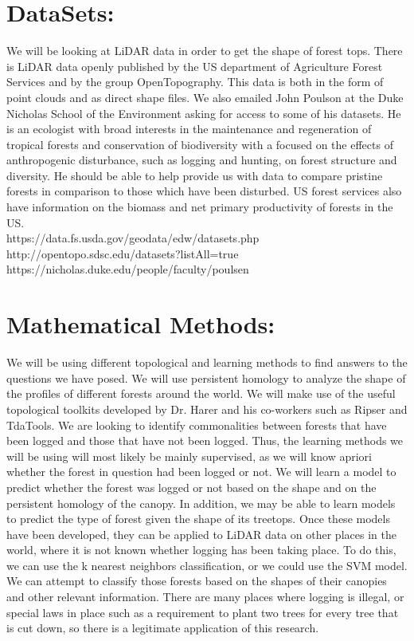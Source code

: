 \documentclass[11pt]{article}
\begin{document}
\section*{DataSets:}
We will be looking at LiDAR data in order to get the shape of forest tops. There is LiDAR data openly published by the US department of Agriculture Forest Services and by the group OpenTopography. This data is both in the form of point clouds and as direct shape files. We also emailed John Poulson at the Duke Nicholas School of the Environment asking for access to some of his datasets. He is an ecologist with broad interests in the maintenance and regeneration of tropical forests and conservation of biodiversity with a focused on the effects of anthropogenic disturbance, such as logging and hunting, on forest structure and diversity. He should be able to help provide us with data to compare pristine forests in comparison to those which have been disturbed. US forest services also have information on the biomass and net primary productivity of forests in the US.
\\
https://data.fs.usda.gov/geodata/edw/datasets.php\\
http://opentopo.sdsc.edu/datasets?listAll=true\\
https://nicholas.duke.edu/people/faculty/poulsen



\section*{Mathematical Methods:}
We will be using different topological and learning methods to find answers to the questions we have posed. We will use persistent homology to analyze the shape of the profiles of different forests around the world. We will make use of the useful topological toolkits developed by Dr. Harer and his co-workers such as Ripser and TdaTools. We are looking to identify commonalities between forests that have been logged and those that have not been logged. Thus, the learning methods we will be using will most likely be mainly supervised, as we will know apriori whether the forest in question had been logged or not. We will learn a model to predict whether the forest was logged or not based on the shape and on the persistent homology of the canopy. In addition, we may be able to learn models to predict the type of forest given the shape of its treetops. Once these models have been developed, they can be applied to LiDAR data on other places in the world, where it is not known whether logging has been taking place. To do this, we can use the k nearest neighbors classification, or we could use the SVM model. We can attempt to classify those forests based on the shapes of their canopies and other relevant information. There are many places where logging is illegal, or special laws in place such as a requirement to plant two trees for every tree that is cut down, so there is a legitimate application of this research.

\newpage
\printbibliography
\end{document}
